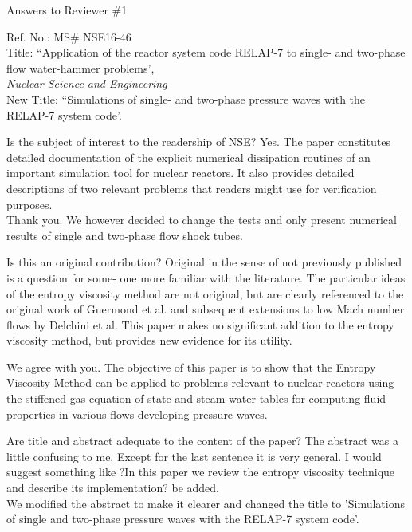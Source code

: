 \documentclass{article}
\begin{document}
\begin{center}
{ \Large Answers to Reviewer \#1}
\end{center}

\bigskip

\noindent Ref. No.: MS\# NSE16-46\\
Title: ``Application of the reactor system code RELAP-7 to single- and two-phase flow water-hammer problems', \\
{\it Nuclear Science and Engineering}\\
New Title: ``Simulations of single- and two-phase pressure waves with the RELAP-7 system code'.
\bigskip
\bigskip

{\color{blue}
Is the subject of interest to the readership of NSE?
Yes. The paper constitutes detailed documentation of the explicit numerical dissipation routines of an important simulation tool for nuclear reactors. It also provides detailed descriptions of two relevant problems that readers might use for verification purposes. \\
}
Thank you. We however decided to change the tests and only present numerical results of single and two-phase flow shock tubes.

\bigskip

{\color{blue}
Is this an original contribution?
Original in the sense of not previously published is a question for some- one more familiar with the literature.
The particular ideas of the entropy viscosity method are not original, but are clearly referenced to the original work of Guermond et al. and subsequent extensions to low Mach number flows by Delchini et al. This paper makes no significant addition to the entropy viscosity method, but provides new evidence for its utility. \\
}

We agree with you. The objective of this paper is to show that the Entropy Viscosity Method can be applied to problems relevant to nuclear reactors using the stiffened gas equation of state and steam-water tables for computing fluid properties in various flows developing pressure waves.

\bigskip

{\color{blue}
Are title and abstract adequate to the content of the paper?
The abstract was a little confusing to me. Except for the last sentence it is very general. I would suggest something like ?In this paper we review the entropy viscosity technique and describe its implementation? be added. \\
}
We modified the abstract to make it clearer and changed the title to 'Simulations of single and two-phase pressure waves with the RELAP-7 system code'. 
\end{document}
